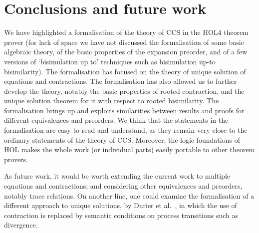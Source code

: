 


\section{Conclusions and future work}
\label{s:concl}

We have highlighted a formalisation of the theory of CCS in the 
HOL4 theorem prover (for lack of space we have not discussed 
the formalisation of some basic algebraic theory, of the basic
properties of the expansion preorder,   and of a few
 versions of `bisimulation up to'
techniques such as  bisimulation up-to bisimilarity). 
The formalisation has focused on the theory of
unique solution of equations and contractions. 
The formalisation has also allowed us to further develop the theory,
notably the basic properties of rooted contraction, and the unique
solution theorem for it with respect to rooted bisimilarity. 
The formalisation brings up and exploits similarities between results
and proofs for different equivalences and preorders. 
We think that the statements in the formalisation are easy to read and
understand, as they remain very close  to  the ordinary  statements of
the theory of CCS. 
Moreover, 
the logic foundations of HOL makes the whole work (or individual
parts) easily portable to other theorem provers.


As future work,  it would be worth extending the current work
to multiple equations and contractions; and considering other equivalences
and preorders, notably trace relations.  
On another line, one could  
examine the formalisation of  a different approach to unique
solutions, by Durier et al.\ \cite{DurierHS17}, in which the use of contraction is
replaced by semantic conditions on process transitions such as
divergence.  



